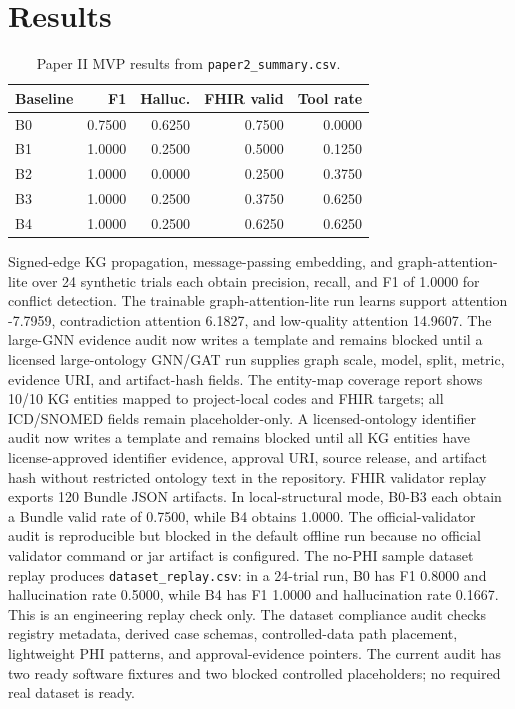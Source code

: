 \documentclass[11pt]{article}
\begin{document}
\section{Results}
\begin{table}[h]
\centering
\caption{Paper II MVP results from \texttt{paper2\_summary.csv}.}
\begin{tabular}{lrrrr}
\toprule
Baseline & F1 & Halluc. & FHIR valid & Tool rate \\
\midrule
B0 & 0.7500 & 0.6250 & 0.7500 & 0.0000 \\
B1 & 1.0000 & 0.2500 & 0.5000 & 0.1250 \\
B2 & 1.0000 & 0.0000 & 0.2500 & 0.3750 \\
B3 & 1.0000 & 0.2500 & 0.3750 & 0.6250 \\
B4 & 1.0000 & 0.2500 & 0.6250 & 0.6250 \\
\bottomrule
\end{tabular}
\end{table}
Signed-edge KG propagation, message-passing embedding, and graph-attention-lite over 24 synthetic trials each obtain precision, recall, and F1 of 1.0000 for conflict detection. The trainable graph-attention-lite run learns support attention -7.7959, contradiction attention 6.1827, and low-quality attention 14.9607.
The large-GNN evidence audit now writes a template and remains blocked until a licensed large-ontology GNN/GAT run supplies graph scale, model, split, metric, evidence URI, and artifact-hash fields.
The entity-map coverage report shows 10/10 KG entities mapped to project-local codes and FHIR targets; all ICD/SNOMED fields remain placeholder-only. A licensed-ontology identifier audit now writes a template and remains blocked until all KG entities have license-approved identifier evidence, approval URI, source release, and artifact hash without restricted ontology text in the repository.
FHIR validator replay exports 120 Bundle JSON artifacts. In local-structural mode, B0-B3 each obtain a Bundle valid rate of 0.7500, while B4 obtains 1.0000.
The official-validator audit is reproducible but blocked in the default offline run because no official validator command or jar artifact is configured.
The no-PHI sample dataset replay produces \texttt{dataset\_replay.csv}: in a 24-trial run, B0 has F1 0.8000 and hallucination rate 0.5000, while B4 has F1 1.0000 and hallucination rate 0.1667. This is an engineering replay check only.
The dataset compliance audit checks registry metadata, derived case schemas, controlled-data path placement, lightweight PHI patterns, and approval-evidence pointers. The current audit has two ready software fixtures and two blocked controlled placeholders; no required real dataset is ready.
\end{document}
